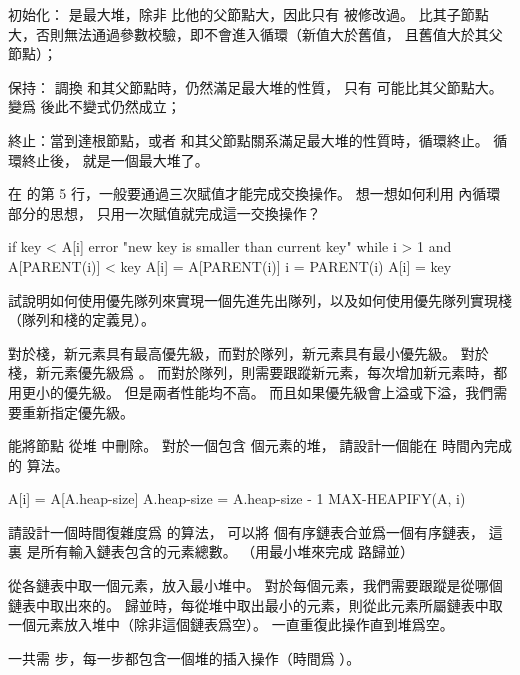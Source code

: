 \startANSWER
{\EMP 初始化：}  是最大堆，除非  比他的父節點大，因此只有  被修改過。
  比其子節點大，否則無法通過參數校驗，即不會進入循環（新值大於舊值，
 且舊值大於其父節點）；

{\EMP 保持：} 調換  和其父節點時，仍然滿足最大堆的性質，
只有  可能比其父節點大。  變爲  後此不變式仍然成立；

{\EMP 終止：}當到達根節點，或者  和其父節點關系滿足最大堆的性質時，循環終止。
循環終止後，  就是一個最大堆了。
\stopANSWER

\startEXERCISE
在  的第 5 行，一般要通過三次賦值才能完成交換操作。
想一想如何利用  內循環部分的思想，
只用一次賦值就完成這一交換操作？
\stopEXERCISE

\startANSWER
{}
\startCLRS
if key < A[i]
	error "new key is smaller than current key"
while i > 1 and A[PARENT(i)] < key
	A[i] = A[PARENT(i)]
	i = PARENT(i)
A[i] = key
\stopCLRS
\stopANSWER

\startEXERCISE
試說明如何使用優先隊列來實現一個先進先出隊列，以及如何使用優先隊列實現棧
（隊列和棧的定義見）。
\stopEXERCISE

\startANSWER
對於棧，新元素具有最高優先級，而對於隊列，新元素具有最小優先級。
對於棧，新元素優先級爲 。
而對於隊列，則需要跟蹤新元素，每次增加新元素時，都用更小的優先級。
但是兩者性能均不高。
而且如果優先級會上溢或下溢，我們需要重新指定優先級。
\stopANSWER

\startEXERCISE
{} 能將節點  從堆  中刪除。
對於一個包含  個元素的堆，
請設計一個能在  時間內完成的  算法。
\stopEXERCISE

\startANSWER
{}
\startCLRS
A[i] = A[A.heap-size]
A.heap-size = A.heap-size - 1
MAX-HEAPIFY(A, i)
\stopCLRS
\stopANSWER

請設計一個時間復雜度爲  的算法，
可以將  個有序鏈表合並爲一個有序鏈表，
這裏  是所有輸入鏈表包含的元素總數。
（\hint 用最小堆來完成  路歸並）
\stopEXERCISE

\startANSWER
從各鏈表中取一個元素，放入最小堆中。
對於每個元素，我們需要跟蹤是從哪個鏈表中取出來的。
歸並時，每從堆中取出最小的元素，則從此元素所屬鏈表中取一個元素放入堆中（除非這個鏈表爲空）。
一直重復此操作直到堆爲空。

一共需  步，每一步都包含一個堆的插入操作（時間爲 ）。
\stopANSWER

\stopsection
